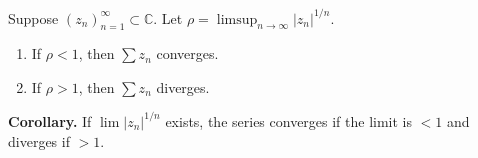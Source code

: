 Suppose $(z_n)_{n=1}^{\infty} \subset \mathbb{C}$. Let $\rho = \limsup_{n \to \infty} |z_n|^{1/n}$.
\begin{enumerate}
\item If $\rho < 1$, then $\sum z_n$ converges.
\item If $\rho > 1$, then $\sum z_n$ diverges.
\end{enumerate}
\textbf{Corollary.} If $\lim |z_n|^{1/n}$ exists, the series converges if the limit is $< 1$ and diverges if $> 1$.
